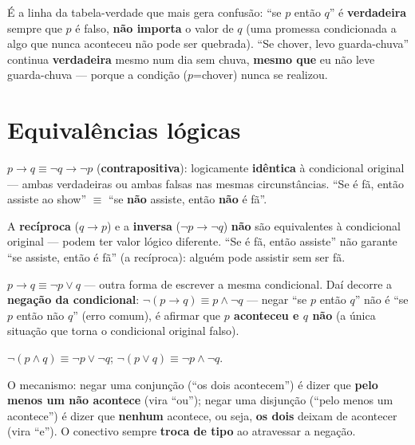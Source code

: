 \begin{cuidado}
É a linha da tabela-verdade que mais gera confusão: “se $p$ então $q$” é
\textbf{verdadeira} sempre que $p$ é falso, \textbf{não importa} o valor
de $q$ (uma promessa condicionada a algo que nunca aconteceu não pode ser
quebrada). “Se chover, levo guarda-chuva” continua \textbf{verdadeira}
mesmo num dia sem chuva, \textbf{mesmo que} eu não leve guarda-chuva ---
porque a condição ($p$=chover) nunca se realizou.
\end{cuidado}

\section{Equivalências lógicas}

\begin{conceito}
$p \to q \equiv \lnot q \to \lnot p$ (\textbf{contrapositiva}): logicamente
\textbf{idêntica} à condicional original --- ambas verdadeiras ou ambas
falsas nas mesmas circunstâncias. “Se é fã, então assiste ao show” $\equiv$
“se \textbf{não} assiste, então \textbf{não} é fã”.

A \textbf{recíproca} ($q \to p$) e a \textbf{inversa} ($\lnot p \to \lnot
q$) \textbf{não} são equivalentes à condicional original --- podem ter
valor lógico diferente. “Se é fã, então assiste” não garante “se assiste,
então é fã” (a recíproca): alguém pode assistir sem ser fã.
\end{conceito}

\begin{conceito}
$p \to q \equiv \lnot p \lor q$ --- outra forma de escrever a mesma
condicional. Daí decorre a \textbf{negação da condicional}: $\lnot(p \to
q) \equiv p \land \lnot q$ --- negar “se $p$ então $q$” não é “se $p$
então não $q$” (erro comum), é afirmar que \textbf{$p$ aconteceu e $q$
não} (a única situação que torna o condicional original falso).
\end{conceito}

\begin{conceito}
$\lnot(p \land q) \equiv \lnot p \lor \lnot q$;\quad
$\lnot(p \lor q) \equiv \lnot p \land \lnot q$.

O mecanismo: negar uma conjunção (“os dois acontecem”) é dizer que
\textbf{pelo menos um não acontece} (vira “ou”); negar uma disjunção (“pelo
menos um acontece”) é dizer que \textbf{nenhum} acontece, ou seja,
\textbf{os dois} deixam de acontecer (vira “e”). O conectivo sempre
\textbf{troca de tipo} ao atravessar a negação.
\end{conceito}

